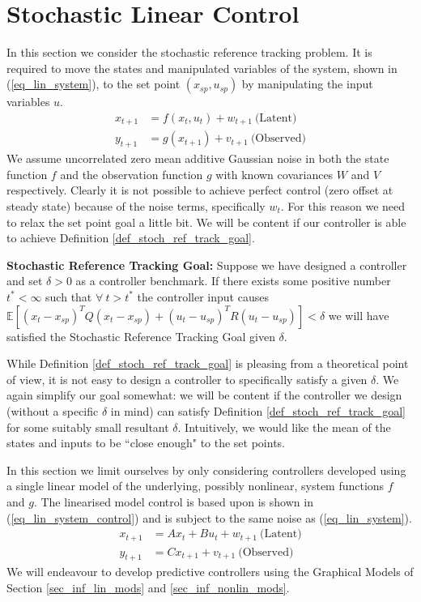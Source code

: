 \chapter{Stochastic Linear Control}
\label{sec_linear_control}
In this section we consider the stochastic reference tracking problem. It is required to move the states and manipulated variables of the system, shown in (\ref{eq_lin_system}), to the set point $(x_{sp}, u_{sp})$ by manipulating the input variables $u$.
\begin{equation}
\begin{aligned}
x_{t+1} &= f(x_t, u_t) + w_{t+1}~\text{(Latent)}  \\
y_{t+1} &= g(x_{t+1}) + v_{t+1} ~\text{(Observed)} 
\end{aligned}
\label{eq_lin_system}
\end{equation}
We assume uncorrelated zero mean additive Gaussian noise in both the state function $f$ and the observation function $g$ with known covariances $W$ and $V$ respectively. Clearly it is not possible to achieve perfect control (zero offset at steady state) because of the noise terms, specifically $w_t$. For this reason we need to relax the set point goal a little bit. We will be content if our controller is able to achieve Definition \ref{def_stoch_ref_track_goal}.
\begin{defn}
\textbf{Stochastic Reference Tracking Goal:} Suppose we have designed a controller and set $\delta > 0$ as a controller benchmark. If there exists some positive number $t^* < \infty$ such that $\forall~t > t^*$ the controller input causes $\mathbb{E}[(x_t-x_{sp})^TQ(x_t-x_{sp}) + (u_t-u_{sp})^TR(u_t-u_{sp})] < \delta$ we will have satisfied the Stochastic Reference Tracking Goal given $\delta$.
\label{def_stoch_ref_track_goal}
\end{defn}
While Definition \ref{def_stoch_ref_track_goal} is pleasing from a theoretical point of view, it is not easy to design a controller to specifically satisfy a given $\delta$. We again simplify our goal somewhat: we will be content if the controller we design (without a specific $\delta$ in mind) can satisfy Definition \ref{def_stoch_ref_track_goal} for some suitably small resultant  $\delta$. Intuitively, we would like the mean of the states and inputs to be ``close enough" to the set points. 

In this section we limit ourselves by only considering controllers developed using a single linear model of the underlying, possibly nonlinear, system functions $f$ and $g$. The linearised model control is based upon is shown in (\ref{eq_lin_system_control}) and is subject to the same noise as (\ref{eq_lin_system}).
\begin{equation}
\begin{aligned}
x_{t+1} &= Ax_t + Bu_t + w_{t+1}~\text{(Latent)}  \\
y_{t+1} &= Cx_{t+1} + v_{t+1}~\text{(Observed)}  
\end{aligned}
\label{eq_lin_system_control}
\end{equation}
We will endeavour to develop predictive controllers using the Graphical Models of Section \ref{sec_inf_lin_mods} and \ref{sec_inf_nonlin_mods}.

